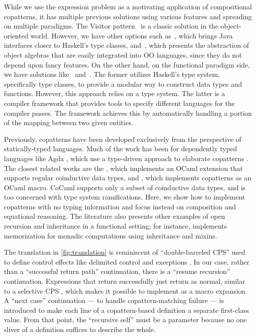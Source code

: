 While we use the expression problem as a motivating application of compositional copatterns, it has multiple previous solutions using various features and spreading on multiple paradigms.
The Visitor pattern~\cite{GangOfFour} is a classic solution in the object-oriented world.
However, we have other options such as~\cite{wehr_javagi_2011}, which brings Java interfaces closer to Haskell's type classes, and~\cite{hutchison_extensibility_2012}, which presents the abstraction of object algebras that are easily integrated into OO languages, since they do not depend upon fancy features.
On the other hand, on the functional paradigm side, we have solutions like~\cite{swierstra_data_2008} and~\cite{keep_nanopass_2013}.
The former utilizes Haskell's type system, specifically type classes, to provide a modular way to construct data types and functions.
However, this approach relies on a type system.
The latter is a compiler framework that provides tools to specify different languages for the compiler passes. The framework achieves this by automatically handling a portion of the mapping between two given entities.

Previously, copatterns have been developed exclusively from the perspective of statically-typed languages.
Much of the work has been for dependently typed languages like Agda \cite{ElaboratingDependentCopatterns}, which use a type-driven approach to elaborate copatterns \cite{UnnestingCopatterns,ThibodeauMasters}.
The closest related works are the \cite{jeannin_cocaml_2017}, which implements an OCaml extension that supports regular coinductive data types, and \cite{LaforgueR17}, which implements copatterns as an OCaml macro.
CoCaml\cite{jeannin_cocaml_2017} supports only a subset of coinductive data types, and \cite{LaforgueR17} is too concerned with type system ramifications.
Here, we show how to implement copatterns with no typing information and focus instead on composition and equational reasoning.
The literature also presents other examples of open recursion and inheritance in a functional setting; for instance, \cite{Brown2009FunctionI} implements memorization for monadic computations using inheritance and mixins.

The translation in \cref{fig:translation} is reminiscent of ``double-barreled CPS'' \cite{DoubleBarrelCPS} used to define control effects like delimited control \cite{AbstractingControl} and exceptions \cite{KimYiDanvy98}.
In our case, rather than a ``successful return path'' continuation, there is a ``resume recursion'' continuation.
Expressions that return successfully just return as normal, similar to a selective CPS \cite{SelectiveCPS}, which makes it possible to implement as a macro expansion.
A ``next case'' continuation --- to handle copattern-matching failure --- is introduced to make each line of a copattern-based definition a separate first-class value.
From that point, the ``recursive self'' must be a parameter because no one sliver of a definition suffices to describe the whole.

